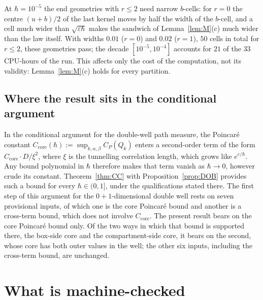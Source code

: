 \documentclass[11pt,a4paper]{article}
\theoremstyle{definition}
\theoremstyle{remark}
\begin{document}
At $\hbar=10^{-5}$ the end geometries with $r\le2$ need narrow $b$-cells: for $r=0$ the centre $(u+b)/2$ of the last kernel moves by half the width of the $b$-cell, and a cell much wider than $\sqrt{\varepsilon\hbar}$ makes the sandwich of Lemma~\ref{lem:M}(c) much wider than the law itself. With widths $0.01$ ($r=0$) and $0.02$ ($r=1$), $50$ cells in total for $r\le2$, these geometries pass; the decade $[10^{-5},10^{-4}]$ accounts for $21$ of the $33$ CPU-hours of the run. This affects only the cost of the computation, not its validity: Lemma~\ref{lem:M}(c) holds for every partition.

\subsection{Where the result sits in the conditional argument}
In the conditional argument for the double-well path measure, the Poincar\'e constant $C_{\mathrm{core}}(\hbar):=\sup_{k,\alpha,\beta}C_P(Q_k)$ enters a second-order term of the form $C_{\mathrm{core}}\cdot D/\xi^2$, where $\xi$ is the tunnelling correlation length, which grows like $e^{c/\hbar}$. Any bound polynomial in $\hbar$ therefore makes that term vanish as $\hbar\to0$, however crude its constant. Theorem~\ref{thm:CC} with Proposition~\ref{prop:DOB} provides such a bound for every $\hbar\in(0,1]$, under the qualifications stated there. The first step of this argument for the $0+1$-dimensional double well rests on seven provisional inputs, of which one is the core Poincar\'e bound and another is a cross-term bound, which does not involve $C_{\mathrm{core}}$. The present result bears on the core Poincar\'e bound only. Of the two ways in which that bound is supported there, the box-side core and the compartment-side core, it bears on the second, whose core has both outer values in the well; the other six inputs, including the cross-term bound, are unchanged.

\section{What is machine-checked}\label{sec:lean}
\end{document}
